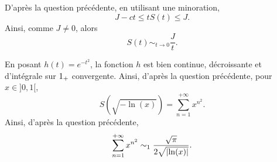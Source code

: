 \begin{solution}
\begin{reponses}
\item D'après la question précédente, en utilisant une minoration,
\[
J - c t \leq t S(t) \leq J.
\]
Ainsi, comme $J \neq 0$, alors
\[
S(t) \sim_{t\to0} \frac{J}{t}.
\]

\item En posant $h(t) = e^{-t^2}$, la fonction $h$ est bien continue, décroissante et d'intégrale sur $1_+$ convergente. Ainsi, d'après la question précédente, pour $x \in ]0, 1[$,
\[
S(\sqrt{-\ln(x)}) = \sum_{n=1}^{+\infty} x^{n^2}.
\]
Ainsi, d'après la question précédente,
\[
\sum_{n=1}^{+\infty} x^{n^2} \sim_1 \frac{\sqrt{\pi}}{2 \sqrt{\abs{\ln(x)}}}.
\]
\end{reponses}
\end{solution}
